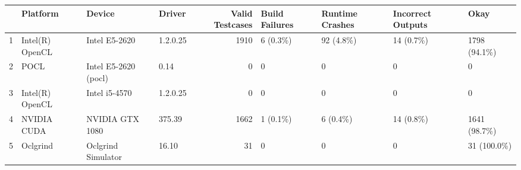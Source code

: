 \begin{tabular}{llllrllll}
\toprule
{} &         Platform &                Device &    Driver &  Valid Testcases & Build Failures & Runtime Crashes & Incorrect Outputs &          Okay \\
\midrule
1 &  Intel(R) OpenCL &         Intel E5-2620 &  1.2.0.25 &             1910 &       6 (0.3\%) &       92 (4.8\%) &         14 (0.7\%) &  1798 (94.1\%) \\
2 &             POCL &  Intel E5-2620 (pocl) &      0.14 &                0 &              0 &               0 &                 0 &             0 \\
3 &  Intel(R) OpenCL &         Intel i5-4570 &  1.2.0.25 &                0 &              0 &               0 &                 0 &             0 \\
4 &      NVIDIA CUDA &       NVIDIA GTX 1080 &    375.39 &             1662 &       1 (0.1\%) &        6 (0.4\%) &         14 (0.8\%) &  1641 (98.7\%) \\
5 &         Oclgrind &    Oclgrind Simulator &     16.10 &               31 &              0 &               0 &                 0 &   31 (100.0\%) \\
\bottomrule
\end{tabular}
